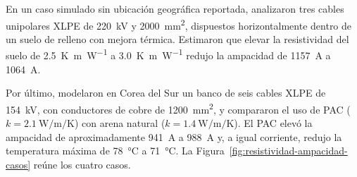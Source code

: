 \documentclass[11pt,a4paper,oneside]{report}
\begin{document}
En un caso simulado sin ubicación geográfica reportada, \textcite[15--16]{atoccsa2024} analizaron tres cables unipolares XLPE de \SI{220}{\kilo\volt} y \SI{2000}{\milli\metre\squared}, dispuestos horizontalmente dentro de un suelo de relleno con mejora térmica. Estimaron que elevar la resistividad del suelo de \SI{2.5}{\kelvin\metre\per\watt} a \SI{3.0}{\kelvin\metre\per\watt} redujo la ampacidad de \SI{1157}{\ampere} a \SI{1064}{\ampere}.

Por último, \textcite[12--16]{kim2025} modelaron en Corea del Sur un banco de seis cables XLPE de \SI{154}{\kilo\volt}, con conductores de cobre de \SI{1200}{\milli\metre\squared}, y compararon el uso de PAC ($k=\SI{2.1}{\watt\per\metre\per\kelvin}$) con arena natural ($k=\SI{1.4}{\watt\per\metre\per\kelvin}$). El PAC elevó la ampacidad de aproximadamente \SI{941}{\ampere} a \SI{988}{\ampere} y, a igual corriente, redujo la temperatura máxima de \SI{78}{\celsius} a \SI{71}{\celsius}. La Figura~\ref{fig:resistividad-ampacidad-casos} reúne los cuatro casos.
\end{document}
